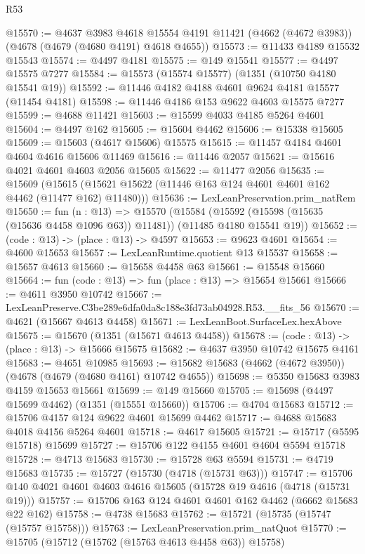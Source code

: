 \begin{lexlean}{R53}
\begin{coremodule}
@15570 := @4637
    @3983
    @4618
    @15554
    @4191
    @11421
    (@4662 (@4672 @3983))
    (@4678 (@4679 (@4680 @4191) @4618 @4655))
@15573 := @11433 @4189 @15532 @15543
@15574 := @4497 @4181
@15575 := @149 @15541
@15577 := @4497 @15575 @7277
@15584 := @15573 (@15574 @15577) (@1351 (@10750 @4180 @15541 @19))
@15592 := @11446 @4182 @4188 @4601 @9624 @4181 @15577 (@11454 @4181)
@15598 := @11446 @4186 @153 @9622 @4603 @15575 @7277
@15599 := @4688 @11421
@15603 := @15599 @4033 @4185 @5264 @4601
@15604 := @4497 @162
@15605 := @15604 @4462
@15606 := @15338 @15605
@15609 := @15603 (@4617 @15606) @15575
@15615 := @11457 @4184 @4601 @4604 @4616 @15606 @11469
@15616 := @11446 @2057
@15621 := @15616 @4021 @4601 @4603 @2056 @15605
@15622 := @11477 @2056
@15635 := @15609
    (@15615 (@15621 @15622 (@11446 @163 @124 @4601 @4601 @162 @4462 (@11477 @162) @11480)))
@15636 := LexLeanPreservation.prim_natRem
@15650 := fun (n : @13) =>
  @15570
    (@15584 (@15592 (@15598 (@15635 (@15636 @4458 @1096 @63)) @11481)) (@11485 @4180 @15541 @19))
@15652 := (code : @13) -> (place : @13) -> @4597
@15653 := @9623 @4601
@15654 := @4600 @15653
@15657 := LexLeanRuntime.quotient @13 @15537
@15658 := @15657 @4613
@15660 := @15658 @4458 @63
@15661 := @15548 @15660
@15664 := fun (code : @13) => fun (place : @13) => @15654 @15661
@15666 := @4611 @3950 @10742
@15667 := LexLeanPreserve.C3be289e6dfa0da8c188e3fd73ab04928.R53.__fits_56
@15670 := @4621 (@15667 @4613 @4458)
@15671 := LexLeanBoot.SurfaceLex.hexAbove
@15675 := @15670 (@1351 (@15671 @4613 @4458))
@15678 := (code : @13) -> (place : @13) -> @15666 @15675
@15682 := @4637 @3950 @10742 @15675 @4161
@15683 := @4651 @10985
@15693 := @15682 @15683 (@4662 (@4672 @3950)) (@4678 (@4679 (@4680 @4161) @10742 @4655))
@15698 := @5350 @15683 @3983 @4159 @15653 @15661
@15699 := @149 @15660
@15705 := @15698 (@4497 @15699 @4462) (@1351 (@15551 @15660))
@15706 := @4704 @15683
@15712 := @15706 @4157 @124 @9622 @4601 @15699 @4462
@15717 := @4688 @15683 @4018 @4156 @5264 @4601
@15718 := @4617 @15605
@15721 := @15717 (@5595 @15718) @15699
@15727 := @15706 @122 @4155 @4601 @4604 @5594 @15718
@15728 := @4713 @15683
@15730 := @15728 @63 @5594
@15731 := @4719 @15683
@15735 := @15727 (@15730 (@4718 (@15731 @63)))
@15747 := @15706 @140 @4021 @4601 @4603 @4616 @15605 (@15728 @19 @4616 (@4718 (@15731 @19)))
@15757 := @15706 @163 @124 @4601 @4601 @162 @4462 (@6662 @15683 @22 @162)
@15758 := @4738 @15683
@15762 := @15721 (@15735 (@15747 (@15757 @15758)))
@15763 := LexLeanPreservation.prim_natQuot
@15770 := @15705 (@15712 (@15762 (@15763 @4613 @4458 @63)) @15758)

\end{coremodule}
\end{lexlean}
